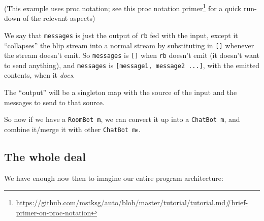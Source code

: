 \documentclass[]{article}
\newenvironment{Shaded}{}{}
\newcommand{\KeywordTok}[1]{\textcolor[rgb]{0.00,0.44,0.13}{\textbf{{#1}}}}
\newcommand{\DataTypeTok}[1]{\textcolor[rgb]{0.56,0.13,0.00}{{#1}}}
\newcommand{\CommentTok}[1]{\textcolor[rgb]{0.38,0.63,0.69}{\textit{{#1}}}}
\newcommand{\OtherTok}[1]{\textcolor[rgb]{0.00,0.44,0.13}{{#1}}}
\newcommand{\FunctionTok}[1]{\textcolor[rgb]{0.02,0.16,0.49}{{#1}}}
\newcommand{\NormalTok}[1]{{#1}}
\renewcommand{\href}[2]{#2\footnote{\url{#1}}}
\begin{document}
\begin{Shaded}
\end{Shaded}

(This example uses proc notation; see this
\href{https://github.com/mstksg/auto/blob/master/tutorial/tutorial.md\#brief-primer-on-proc-notation}{proc
notation primer} for a quick run-down of the relevant aspects)

We say that \texttt{messages} is just the output of \texttt{rb} fed with the
input, except it ``collapses'' the blip stream into a normal stream by
substituting in \texttt{{[}{]}} whenever the stream doesn't emit. So
\texttt{messages} is \texttt{{[}{]}} when \texttt{rb} doesn't emit (it doesn't
want to send anything), and \texttt{messages} is
\texttt{{[}message1,\ message2\ ...{]}}, with the emitted contents, when it
\emph{does}.

The ``output'' will be a singleton map with the source of the input and the
messages to send to that source.

So now if we have a \texttt{RoomBot\ m}, we can convert it up into a
\texttt{ChatBot\ m}, and combine it/merge it with other \texttt{ChatBot\ m}s.

\subsection{The whole deal}\label{the-whole-deal}

We have enough now then to imagine our entire program architecture:
\end{document}
